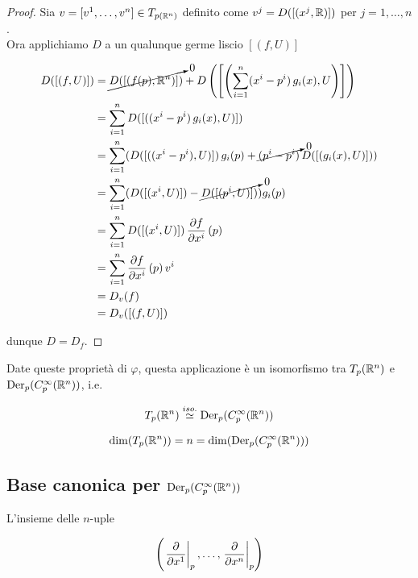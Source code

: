\begin{proof}
	Sia $ v = [v^{1},\dots,v^{n}] \in T_{p (\mathbb{R}^{n})} $ definito come $ v^{j} = D([(x^{j},\mathbb{R})]) $ per $ j=1,\dots,n $. \\
	Ora applichiamo $ D $ a un qualunque germe liscio $ [(f,U)] $
	
	\begin{align}
		\begin{split}
			D ([(f,U)]) &= \cancelto{0}{D ([(f(p),\mathbb{R}^{n})])} + D \left(\left[\left( \sum_{i=1}^{n} (x^{i}-p^{i}) \, g_{i}(x) , U \right)\right]\right) \\
			&= \sum_{i=1}^{n} D ([( (x^{i}-p^{i}) \, g_{i}(x) , U )]) \\
			&= \sum_{i=1}^{n} ( D ([( (x^{i}-p^{i}), U )]) \, g_{i}(p) + \cancelto{0}{(p^{i}-p^{i})} \, D ([( g_{i}(x), U )]) ) \\
			&= \sum_{i=1}^{n} ( D ([( x^{i}, U )]) - \cancelto{0}{D ([( p^{i}, U )])} ) g_{i}(p) \\
			&= \sum_{i=1}^{n} D ([( x^{i}, U )]) \, \pdv{f}{x^{i}} \, (p) \\
			&= \sum_{i=1}^{n} \pdv{f}{x^{i}} \, (p) \, v^{i} \\
			&= D_{v} (f) \\
			&= D_{v} ([(f,U)])
		\end{split}
	\end{align}

	dunque $ D = D_{f} $.
\end{proof}

Date queste proprietà di $ \varphi $, questa applicazione è un isomorfismo tra $ T_{p}(\mathbb{R}^{n}) $ e $ \operatorname{Der}_{p}(C_{p}^{\infty}(\mathbb{R}^{n})) $, i.e.

\begin{equation}
	T_{p}(\mathbb{R}^{n}) \stackrel{iso.}{\simeq} \operatorname{Der}_{p}(C_{p}^{\infty}(\mathbb{R}^{n}))
\end{equation}

\begin{corollary}
	\begin{equation}
		\dim ( T_{p}(\mathbb{R}^{n}) ) = n = \dim ( \operatorname{Der}_{p}(C_{p}^{\infty}(\mathbb{R}^{n})) )
	\end{equation}
\end{corollary}

\subsection{Base canonica per $ \operatorname{Der}_{p}(C_{p}^{\infty}(\mathbb{R}^{n})) $}

L'insieme delle $ n $-uple

\begin{equation}
	\left( \eval{ \pdv{x^{1}} }_{p}, \dots, \eval{ \pdv{x^{n}} }_{p}  \right)
\end{equation}


